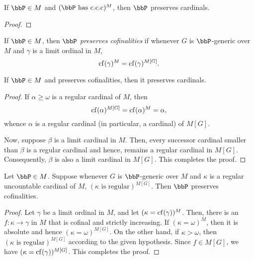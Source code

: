 \begin{corollary}
    If $\bbP\in M$ and $(\bbP\text{ has c.c.c})^M$, then $\bbP$ preserves cardinals.
\end{corollary}
\begin{proof}
\end{proof}

\begin{definition}
    If $\bbP\in M$, then $\bbP$ \emph{preserves cofinalities} if whenever $G$ is $\bbP$-generic over $M$ and $\gamma$ is a limit ordinal in $M$, 
    \begin{equation*}
        \operatorname{cf}(\gamma)^M = \operatorname{cf}(\gamma)^{M[G]}.
    \end{equation*}
\end{definition}

\begin{lemma}
    If $\bbP\in M$ and preserves cofinalities, then it preserves cardinals.
\end{lemma}
\begin{proof}
    If $\alpha\ge\omega$ is a regular cardinal of $M$, then 
    \begin{equation*}
        \operatorname{cf}(\alpha)^{M[G]} = \operatorname{cf}(\alpha)^M = \alpha,
    \end{equation*}
    whence $\alpha$ is a regular cardinal (in particular, a cardinal) of $M[G]$.

    Now, suppose $\beta$ is a limit cardinal in $M$. Then, every successor cardinal smaller than $\beta$ is a regular cardinal and hence, remains a regular cardinal in $M[G]$. Consequently, $\beta$ is also a limit cardinal in $M[G]$. This completes the proof. 
\end{proof}

\begin{lemma}
    Let $\bbP\in M$. Suppose whenever $G$ is $\bbP$-generic over $M$ and $\kappa$ is a regular uncountable cardinal of $M$, $(\kappa\text{ is regular})^{M[G]}$. Then $\bbP$ preserves cofinalities.
\end{lemma}
\begin{proof}
    Let $\gamma$ be a limit ordinal in $M$, and let $(\kappa = \operatorname{cf}(\gamma))^M$. Then, there is an $f:\kappa\to\gamma$ in $M$ that is cofinal and strictly increasing. If $(\kappa = \omega)^M$, then it is absolute and hence $(\kappa = \omega)^{M[G]}$. On the other hand, if $\kappa > \omega$, then $(\kappa\text{ is regular})^{M[G]}$ according to the given hypothesis. Since $f\in M[G]$, we have $(\kappa = \operatorname{cf}(\gamma))^{M[G]}$. This completes the proof.
\end{proof}

